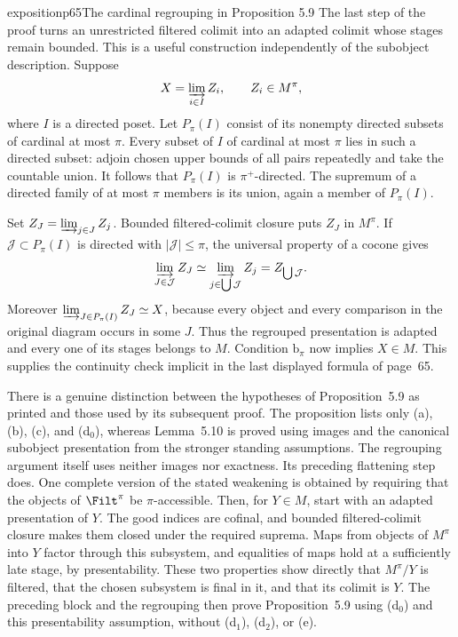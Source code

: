 \begin{dcomment}{exposition}{p65}{The cardinal regrouping in Proposition 5.9}
The last step of the proof turns an unrestricted filtered colimit into an adapted colimit whose stages remain bounded. This is a useful construction independently of the subobject description. Suppose
\[
 X=\varinjlim_{i\in I}Z_i,\qquad Z_i\in M^\pi,
\]
where $I$ is a directed poset. Let $P_\pi(I)$ consist of its nonempty directed subsets of cardinal at most $\pi$. Every subset of $I$ of cardinal at most $\pi$ lies in such a directed subset: adjoin chosen upper bounds of all pairs repeatedly and take the countable union. It follows that $P_\pi(I)$ is $\pi^+$-directed. The supremum of a directed family of at most $\pi$ members is its union, again a member of $P_\pi(I)$.

Set $Z_J=\varinjlim_{j\in J}Z_j$. Bounded filtered-colimit closure puts $Z_J$ in $M^\pi$. If $\mathcal J\subset P_\pi(I)$ is directed with $|\mathcal J|\leq\pi$, the universal property of a cocone gives
\[
 \varinjlim_{J\in\mathcal J}Z_J
 \simeq\varinjlim_{j\in\bigcup\mathcal J}Z_j
 =Z_{\bigcup\mathcal J}.
\]
Moreover $\varinjlim_{J\in P_\pi(I)}Z_J\simeq X$, because every object and every comparison in the original diagram occurs in some $J$. Thus the regrouped presentation is adapted and every one of its stages belongs to $M$. Condition $\mathrm b_\pi$ now implies $X\in M$. This supplies the continuity check implicit in the last displayed formula of page~65.

There is a genuine distinction between the hypotheses of Proposition~5.9 as printed and those used by its subsequent proof. The proposition lists only (a), (b), (c), and (d$_0$), whereas Lemma~5.10 is proved using images and the canonical subobject presentation from the stronger standing assumptions. The regrouping argument itself uses neither images nor exactness. Its preceding flattening step does. One complete version of the stated weakening is obtained by requiring that the objects of $\Filt^\pi$ be $\pi$-accessible. Then, for $Y\in M$, start with an adapted presentation of $Y$. The good indices are cofinal, and bounded filtered-colimit closure makes them closed under the required suprema. Maps from objects of $M^\pi$ into $Y$ factor through this subsystem, and equalities of maps hold at a sufficiently late stage, by presentability. These two properties show directly that $M^\pi/Y$ is filtered, that the chosen subsystem is final in it, and that its colimit is $Y$. The preceding block and the regrouping then prove Proposition~5.9 using (d$_0$) and this presentability assumption, without (d$_1$), (d$_2$), or (e).


\end{dcomment}
